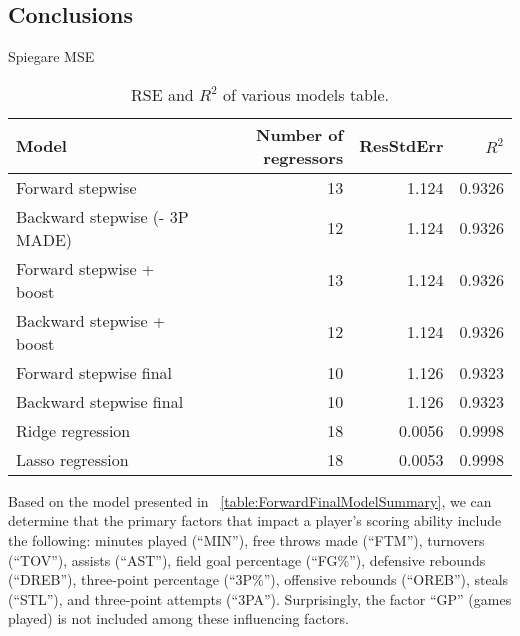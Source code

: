 \subsection{Conclusions}

Spiegare MSE

\begin{table}[H]
	\centering
	\begin{tabular}{|| l | r | r | r ||} 
		\hline
		Model & Number of regressors & ResStdErr & $R^2$ \\
		\hline
		Forward stepwise & 13 & 1.124 & 0.9326 \\
		\hline
		Backward stepwise (- 3P MADE) & 12 & 1.124 & 0.9326 \\
		\hline
		Forward stepwise + boost & 13 & 1.124 & 0.9326 \\
		\hline
		Backward stepwise + boost & 12 & 1.124 & 0.9326 \\
		\hline
		Forward stepwise final & 10 & 1.126 & 0.9323 \\
		\hline
		Backward stepwise final & 10 & 1.126 & 0.9323 \\
		\hline
		Ridge regression & 18 & 0.0056 & 0.9998 \\
		\hline
		Lasso regression & 18 & 0.0053 & 0.9998 \\
		\hline
	\end{tabular}
	\caption{RSE and $R^2$ of various models table.}
	\label{table:RegEvalParams}
\end{table}

Based on the model presented in \Tab~\ref{table:ForwardFinalModelSummary}, we can determine that the primary factors that impact a player's scoring ability include the following: minutes played (``MIN''), free throws made (``FTM''), turnovers (``TOV''), assists (``AST''), field goal percentage (``FG\%''), defensive rebounds (``DREB''), three-point percentage (``3P\%''), offensive rebounds (``OREB''), steals (``STL''), and three-point attempts (``3PA'').
Surprisingly, the factor ``GP'' (games played) is not included among these influencing factors.